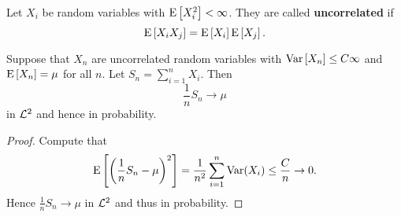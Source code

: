 \begin{definition}
    Let $X_i$ be random variables with $\operatorname{E}\left[ {X_i^2} \right]<\infty$. They are called 
    \textbf{uncorrelated} if 
    \begin{equation*}
        \operatorname{E}\left[ {X_iX_j} \right] = \operatorname{E}\left[ {X_i} \right]\operatorname{E}\left[ {X_j} \right]. 
    \end{equation*} 
\end{definition}

\begin{theorem}
    Suppose that $X_n$ are uncorrelated random variables with $\operatorname{Var}\left[ {X_n} \right]\leq C\infty$ 
    and $\operatorname{E}\left[ {X_n} \right] = \mu$ for all $n$. Let $S_n = \sum_{i=1}^n X_i$. Then 
    \begin{equation*}
        \frac{1}{n}S_n\to \mu
    \end{equation*}
    in $\mathcal{L}^2$ and hence in probability. 
\end{theorem}
\begin{proof}
    Compute that 
    \begin{equation*}
        \E\sbrc{\pth{\frac{1}{n}S_n-\mu}^2} = \frac{1}{n^2}\sum_{i=1}^n\Var(X_i) 
        \leq \frac{C}{n}\to 0. 
    \end{equation*}
    Hence $\frac{1}{n}S_n\to\mu$ in $\mathcal{L}^2$ and thus in probability. 
\end{proof}

